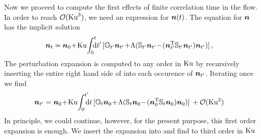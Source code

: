 \documentclass[thesis.tex]{subfiles}
\begin{document}
Now we proceed to compute the first effects of finite correlation time in the flow. In order to reach $\mathcal O(\mbox{Ku}^3)$, we need an expression for $\mbox{\boldmath$n$}(t)$.
The equation for $\mbox{\boldmath$n$}$ has the implicit solution
\begin{align}
\ve n_{t}&=\ve n_0\!+\!\ku\!\int_0^{t}\!\!\!\!{\rm d}t'\,[\ma O_{t'}\ve n_{t'}\!%
+\!\Lambda(\ma S_{t'}\ve n_{t'}\!-\!(\ve n_{t'}\transpose\ma S_{t'}\ve n_{t'})\ve n_{t'})]\,,\eqnlab{n_expansion}
\end{align}
The perturbation expansion is computed  to any order in $\mbox{Ku}$ by recursively inserting the entire right hand side of  into each occurence of $\mbox{\boldmath$n$}_{t'}$.
Iterating once we find
\begin{align}
\ve n_{t'}&=\ve n_0\!+\!\ku\!\int_0^{t'}\!\!\!\!{\rm d}t\,[\ma O_{t}\ve n_{0}\! +\!\Lambda(\ma S_{t}\ve n_{0}\!-\!(\ve n_{0}\transpose\ma S_{t}\ve n_{0})\ve n_{0})]\, + \mathcal O(\ku^2)\eqnlab{n_expansion2}
\end{align}
In principle, we could continue, however, for the present purpose, this first order expansion is enough.
We insert the expansion  into  and find to third order in $\mbox{Ku}$
\end{document}
